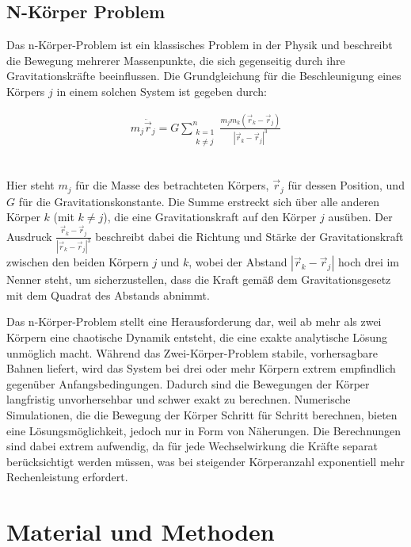 \documentclass[a4paper,12pt,twoside]{article}
\begin{document}
\subsection{N-Körper Problem}
Das n-Körper-Problem ist ein klassisches Problem in der Physik und beschreibt die Bewegung mehrerer Massenpunkte, die sich gegenseitig durch ihre Gravitationskräfte beeinflussen. Die Grundgleichung für die Beschleunigung eines Körpers \( j \) in einem solchen System ist gegeben durch:

\begin{align*}
	m_j \ddot{\vec{r}}_j = G \sum_{\substack{k=1 \\ k \neq j}}^n \frac{m_j m_k (\vec{r}_k - \vec{r}_j)}{|\vec{r}_k - \vec{r}_j|^3}
\end{align*} ~\cite{Schäfer2017}


Hier steht \( m_j \) für die Masse des betrachteten Körpers, \( \vec{r}_j \) für dessen Position, und \( G \) für die Gravitationskonstante. Die Summe erstreckt sich über alle anderen Körper \( k \) (mit \( k \neq j \)), die eine Gravitationskraft auf den Körper \( j \) ausüben. Der Ausdruck \( \frac{\vec{r}_k - \vec{r}_j}{|\vec{r}_k - \vec{r}_j|^3} \) beschreibt dabei die Richtung und Stärke der Gravitationskraft zwischen den beiden Körpern \( j \) und \( k \), wobei der Abstand \( |\vec{r}_k - \vec{r}_j| \) hoch drei im Nenner steht, um sicherzustellen, dass die Kraft gemäß dem Gravitationsgesetz mit dem Quadrat des Abstands abnimmt.

Das n-Körper-Problem stellt eine Herausforderung dar, weil ab mehr als zwei Körpern eine chaotische Dynamik entsteht, die eine exakte analytische Lösung unmöglich macht. Während das Zwei-Körper-Problem stabile, vorhersagbare Bahnen liefert, wird das System bei drei oder mehr Körpern extrem empfindlich gegenüber Anfangsbedingungen.
Dadurch sind die Bewegungen der Körper langfristig unvorhersehbar und schwer exakt zu berechnen. Numerische Simulationen, die die Bewegung der Körper Schritt für Schritt berechnen, bieten eine Lösungsmöglichkeit, jedoch nur in Form von Näherungen. Die Berechnungen sind dabei extrem aufwendig, da für jede Wechselwirkung die Kräfte separat berücksichtigt werden müssen, was bei steigender Körperanzahl exponentiell mehr Rechenleistung erfordert.


\section{Material und Methoden}
\end{document}
